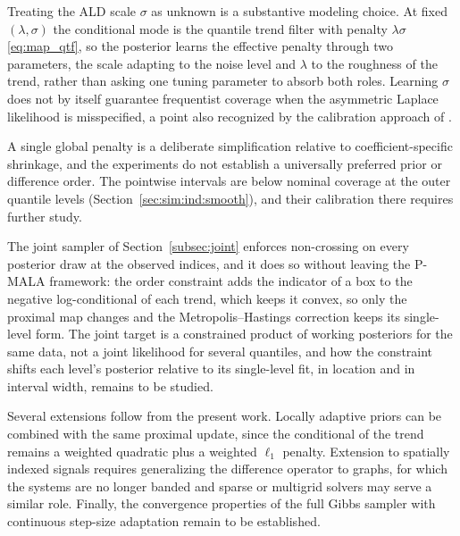 Treating the ALD scale $\sigma$ as unknown is a substantive modeling choice. At fixed $(\lambda, \sigma)$ the conditional mode is the quantile trend filter with penalty $\lambda\sigma$ \eqref{eq:map_qtf}, so the posterior learns the effective penalty through two parameters, the scale adapting to the noise level and $\lambda$ to the roughness of the trend, rather than asking one tuning parameter to absorb both roles. Learning $\sigma$ does not by itself guarantee frequentist coverage when the asymmetric Laplace likelihood is misspecified, a point also recognized by the calibration approach of \citet{onizuka2024fast}.

A single global penalty is a deliberate simplification relative to coefficient-specific shrinkage, and the experiments do not establish a universally preferred prior or difference order. The pointwise intervals are below nominal coverage at the outer quantile levels (Section~\ref{sec:sim:ind:smooth}), and their calibration there requires further study.

The joint sampler of Section~\ref{subsec:joint} enforces non-crossing on every posterior draw at the observed indices, and it does so without leaving the P-MALA framework: the order constraint adds the indicator of a box to the negative log-conditional of each trend, which keeps it convex, so only the proximal map changes and the Metropolis--Hastings correction keeps its single-level form. The joint target is a constrained product of working posteriors for the same data, not a joint likelihood for several quantiles, and how the constraint shifts each level's posterior relative to its single-level fit, in location and in interval width, remains to be studied.

Several extensions follow from the present work. Locally adaptive priors can be combined with the same proximal update, since the conditional of the trend remains a weighted quadratic plus a weighted $\ell_1$ penalty. Extension to spatially indexed signals requires generalizing the difference operator to graphs, for which the systems are no longer banded and sparse or multigrid solvers may serve a similar role. Finally, the convergence properties of the full Gibbs sampler with continuous step-size adaptation remain to be established.
